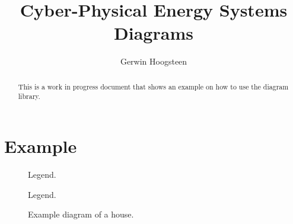 \documentclass[a4paper,10pt]{article}
\title{Cyber-Physical Energy Systems Diagrams}
\author{Gerwin Hoogsteen}
\begin{document}
\maketitle

\begin{abstract}
This is a work in progress document that shows an example on how to use the diagram library.
\end{abstract}

\section{Example}
\begin{figure}[h]
\begin{center}

\caption{Legend.}
\label{fig:legend}
\end{center}
\end{figure}

\begin{figure}[h]
\begin{center}

\caption{Legend.}
\label{fig:legend}
\end{center}
\end{figure}



\begin{figure}[h]
\begin{center}

\caption{Example diagram of a house.}
\label{fig:legend}
\end{center}
\end{figure}
\end{document}
